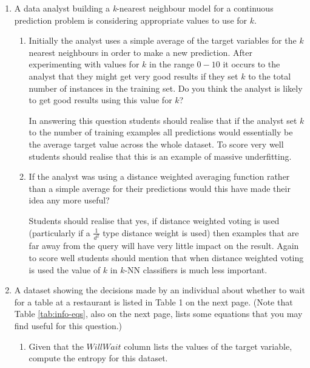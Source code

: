\documentclass[--SOLUTION-OPTION--]{ditpaper}
\begin{document}
\newpage


\newpage

\question 
	\begin{enumerate}
		\item A data analyst building a \emph{k}-nearest neighbour model for a continuous prediction problem is considering appropriate values to use for $k$. 
	\begin{enumerate}
		\item Initially the analyst uses a simple average of the target variables for the $k$ nearest neighbours in order to make a new prediction. After experimenting with values for $k$ in the range $0 - 10$ it occurs to the analyst that they might get very good results if they set $k$ to the total number of instances in the training set. Do you think the analyst is likely to get good results using this value for $k$?
\begin{answer}
In answering this question students should realise that if the analyst set $k$ to the number of training examples all predictions would essentially be the average target value across the whole dataset. To score very well students should realise that this is an example of massive underfitting.
\end{answer}
		\item If the analyst was using a distance weighted averaging function rather than a simple average for their predictions would this have made their idea any more useful?
\begin{answer}
Students should realise that yes, if distance weighted voting is used (particularly if a $\frac{1}{d^2}$ type distance weight is used) then examples that are far away from the query will have very little impact on the result. Again to score well students should mention that when distance weighted voting is used the value of $k$ in $k$-NN classifiers is much less important.
\end{answer}
	\end{enumerate}
		\item A dataset showing the decisions made by an individual about whether to wait for a table at a restaurant is listed in Table 1 on the next page. (Note that Table \ref{tab:info-eqs}, also on the next page, lists some equations that you may find useful for this question.)		
	\begin{enumerate}
		\item Given that the $WillWait$ column lists the values of the target variable, compute the entropy for this dataset.

\end{enumerate}
\end{enumerate}
\end{document}
